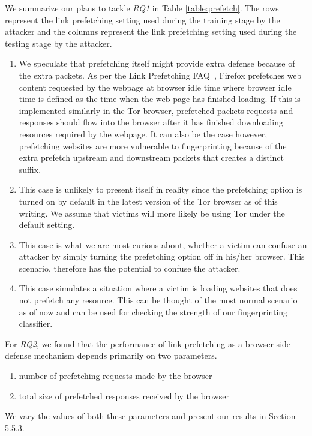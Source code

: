 We summarize our plans to tackle \emph{RQ1} in Table \ref{table:prefetch}.
The rows represent the link prefetching setting used during the training stage by the
attacker and the columns represent the link prefetching setting used
during the testing stage by the attacker. 
\begin{enumerate}
\item
We speculate that prefetching itself might provide extra defense because
of the extra packets. As per the Link Prefetching FAQ~\cite{fisher2003},
Firefox prefetches web content requested by the webpage at browser idle
time where browser idle time is defined as the time when the web page
has finished loading. If this is implemented similarly in the Tor
browser, prefetched packets requests and responses should flow into the
browser after it has finished downloading resources required by the
webpage.
It can also be the case however, prefetching websites are more
vulnerable to fingerprinting because of the extra prefetch upstream and
downstream packets that
creates a distinct suffix.
\item
This case is unlikely to present itself in reality since the prefetching option is turned on by
default in the latest version of the Tor browser as of this writing. We assume that victims will more likely be using Tor under the default setting.
\item
This case is what we are most curious about, whether a victim can
confuse an attacker by simply turning the prefetching option off in
his/her browser. This scenario, therefore has the potential to confuse the
attacker.
\item
This case simulates a situation where a victim is loading websites that does not prefetch any resource.
This can be thought of the most normal scenario as of now and can be used for checking the strength of our fingerprinting classifier.
\end{enumerate}

For \emph{RQ2}, we found that the performance of link prefetching as a
browser-side defense mechanism depends primarily on two parameters.
\begin{enumerate}
\item 
number of prefetching requests made by the browser 
\item 
total size of prefetched responses received by the browser
\end{enumerate}
We vary the values of both these parameters and present our results in
Section 5.5.3.
 
